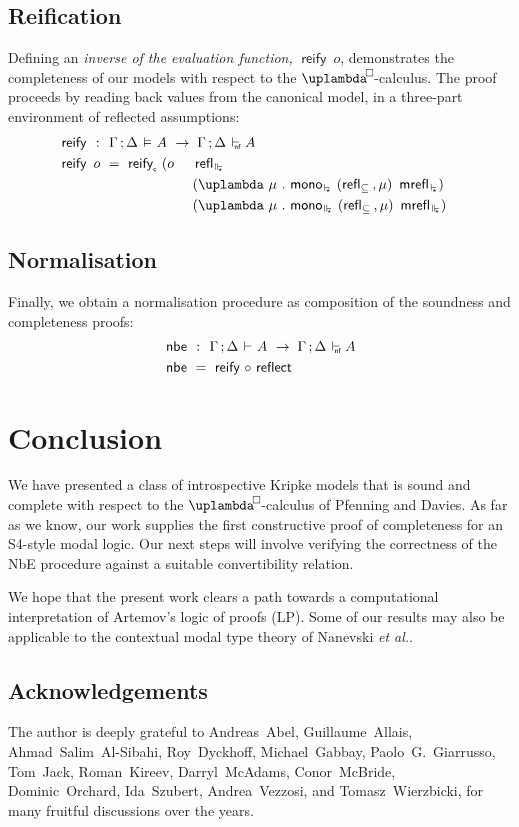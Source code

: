 \documentclass[submission,copyright,creativecommons,sharealike,backref=page]{eptcs}
\newcommand{\uplambdabox}{\uplambda^{\mkern-3mu\Box\mkern-3mu}}
\renewcommand{\leq}{\mathrel{\subseteq}}
\renewcommand{\:}{\mathop{\mkern3mu:\mkern3mu}}
\renewcommand{\.}{\mathop{\mkern3mu.\mkern3mu}}
\renewcommand{\;}{\mathop{;}}
\renewcommand{\,}{\mathop{,}}
\renewcommand{\o}{\mathop{\mkern3mu\circ\mkern3mu}}
\newcommand{\e}{\mathrel{\mkern2mu\vdash\mkern1mu}}
\newcommand{\enf}{\mathrel{\mkern2mu\vdash_{\mkern-9mu\scriptscriptstyle{\textsf{nf}}}}}
\newcommand{\es}{\mathrel{\mkern2mu\vdash_{\mkern-9mu\scriptscriptstyle{\star}}}}
\newcommand{\ees}{\mathrel{\mkern2mu\Vdash_{\mkern-9mu\scriptscriptstyle{\star}}}}
\newcommand{\ef}{\mathrel{\mkern2mu\vDash\mkern1mu}}
\renewcommand{\r}{\mathrel{\rightarrow\mkern-1mu}}
\newcommand{\reflect}{\operatorname{\textsf{reflect}}}
\newcommand{\reify}{\operatorname{\textsf{reify}}}
\newcommand{\reifyc}{\operatorname{\textsf{reify}_{\scriptscriptstyle{\textsf{c}}}}}
\newcommand{\nbe}{\operatorname{\textsf{nbe}}}
\newcommand{\monoes}{\operatorname{\textsf{mono}_{\es}}}
\newcommand{\monoees}{\operatorname{\textsf{mono}_{\ees}}}
\newcommand{\reflleq}{\operatorname{\textsf{refl}_{\leq}}}
\newcommand{\mrefles}{\operatorname{\textsf{mrefl}_{\es}}}
\newcommand{\reflees}{\operatorname{\textsf{refl}_{\ees}}}
\newcommand{\mreflees}{\operatorname{\textsf{mrefl}_{\ees}}}
\theoremstyle{mystyle}
\begin{document}
\subsection{Reification}

Defining an \emph{inverse of the evaluation function,} $\reify~o$, demonstrates the completeness of our models with respect to the $\uplambdabox$-calculus.  The proof proceeds by reading back values from the canonical model, in a three-part environment of reflected assumptions:
\begin{alignat*}{2}
  & \reify ~\:~ \rlap{$\Gamma \; \Delta \ef A ~\r~ \Gamma \; \Delta \enf A$}\\
  & \reify~o ~=~ \reifyc~(o~ && \reflees\\
  &                          && (\uplambda~\mu \. \monoes~(\reflleq \, \mu)~\mrefles)\\
  &                          && (\uplambda~\mu \. \monoees~(\reflleq \, \mu)~\mreflees)
\end{alignat*}


\subsection{Normalisation}

Finally, we obtain a normalisation procedure as composition of the soundness and completeness proofs:
\begin{align*}
  & \nbe ~\:~ \Gamma \; \Delta \e A ~\r~ \Gamma \; \Delta \enf A\\
  & \nbe ~=~ \reify \o \reflect
\end{align*}


\section*{Conclusion}

We have presented a class of introspective Kripke models that is sound and complete with respect to the $\uplambdabox$-calculus of Pfenning and Davies\cite{PfenningD01}.  As far as we know, our work supplies the first constructive proof of completeness for an S4-style modal logic.  Our next steps will involve verifying the correctness of the NbE procedure against a suitable convertibility relation.

We hope that the present work clears a path towards a computational interpretation of Artemov's\cite{Artemov01} logic of proofs (LP).  Some of our results may also be applicable to the contextual modal type theory of Nanevski \emph{et al.}\cite{NanevskiPP08}.


\subsection*{Acknowledgements}

The author is deeply grateful to Andreas~Abel, Guillaume~Allais, Ahmad~Salim~Al-Sibahi, Roy~Dyckhoff, Michael~Gabbay, Paolo~G.~Giarrusso, Tom~Jack, Roman~Kireev, Darryl~McAdams, Conor~McBride, Dominic~Orchard, Ida~Szubert, Andrea~Vezzosi, and Tomasz~Wierzbicki, for many fruitful discussions over the years.

\nocite{*}
% 


\end{document}
